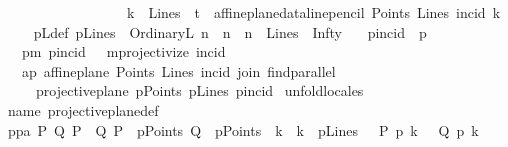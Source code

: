 \begin{isabellebody}
\ \ \ \ \ \ \ \ \ \ \ \ \ \ \ \ \ \ {\isacharparenleft}{\kern0pt}{\isacharparenleft}{\kern0pt}k\ {\isasymin}\ Lines{\isacharparenright}{\kern0pt}\ {\isasymand}\ {\isacharparenleft}{\kern0pt}t\ {\isacharequal}{\kern0pt}\ affine{\isacharunderscore}{\kern0pt}plane{\isacharunderscore}{\kern0pt}data{\isachardot}{\kern0pt}line{\isacharunderscore}{\kern0pt}pencil\ Points\ Lines\ {\isacharparenleft}{\kern0pt}incid{\isacharparenright}{\kern0pt}\ k{\isacharparenright}{\kern0pt}\ {\isacharparenright}{\kern0pt}{\isacharbraceright}{\kern0pt}{\isachardoublequoteclose}\isanewline
\ \ \ pLdef{\isacharcolon}{\kern0pt}\ {\isachardoublequoteopen}pLines\ {\isasymequiv}\ {\isacharbraceleft}{\kern0pt}OrdinaryL\ n\ {\isacharbar}{\kern0pt}\ n\ {\isachardot}{\kern0pt}\ {\isacharparenleft}{\kern0pt}n\ {\isasymin}\ Lines{\isacharparenright}{\kern0pt}{\isacharbraceright}{\kern0pt}\ {\isasymunion}\ {\isacharbraceleft}{\kern0pt}Infty{\isacharbraceright}{\kern0pt}{\isachardoublequoteclose}\isanewline
\ \ \ pincid\ {\isacharparenleft}{\kern0pt}\ {\isachardoublequoteopen}p{\isasymlhd}{\isachardoublequoteclose}\ {}{}{\isacharparenright}{\kern0pt}\isanewline
\ \ \ pm{\isacharcolon}{\kern0pt}\ {\isacartoucheopen}pincid\ {\isacharequal}{\kern0pt}\ \ mprojectivize\ {\isacharparenleft}{\kern0pt}incid{\isacharparenright}{\kern0pt}{\isacartoucheclose}\isanewline
\ \ \ ap{\isacharcolon}{\kern0pt}\ {\isachardoublequoteopen}affine{\isacharunderscore}{\kern0pt}plane\ Points\ Lines\ incid\ join\ find{\isacharunderscore}{\kern0pt}parallel{\isachardoublequoteclose}\isanewline
\ \ \ \ \ {\isachardoublequoteopen}projective{\isacharunderscore}{\kern0pt}plane{}\ pPoints\ pLines\ pincid{\isachardoublequoteclose}\isanewline
%
\isadelimproof
\isanewline
%
\endisadelimproof
%
\isatagproof
{}\isamarkupfalse%
\ {\isacharparenleft}{\kern0pt}unfold{\isacharunderscore}{\kern0pt}locales{\isacharparenright}{\kern0pt}\isanewline
\ \ \isamarkupfalse%
\ name{\isacharcolon}{\kern0pt}\ projective{\isacharunderscore}{\kern0pt}plane{}{\isacharunderscore}{\kern0pt}def\isanewline
\isanewline
\ \ \isamarkupfalse%
\ pp{}a{\isacharcolon}{\kern0pt}\ {\isachardoublequoteopen}{\isasymAnd}P\ Q\ {\isachardot}{\kern0pt}{\isasymlbrakk}P\ {\isasymnoteq}\ Q{\isacharsemicolon}{\kern0pt}\ P\ {\isasymin}\ pPoints{\isacharsemicolon}{\kern0pt}\ Q\ {\isasymin}\ pPoints{\isasymrbrakk}\ {\isasymLongrightarrow}\ {\isacharparenleft}{\kern0pt}{\isasymexists}k\ {\isachardot}{\kern0pt}\ k\ {\isasymin}\ pLines\ {\isasymand}\ \ P\ p{\isasymlhd}\ k\ \ {\isasymand}\ Q\ p{\isasymlhd}\ k{\isacharparenright}{\kern0pt}{\isachardoublequoteclose}\ \isamarkupfalse%

\end{isabellebody}
